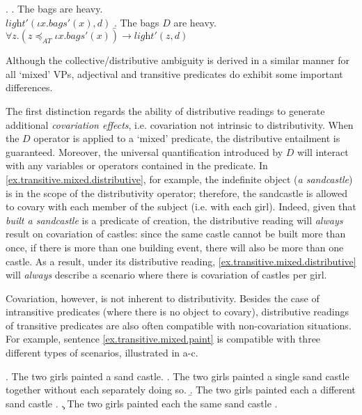 \documentclass[a4paper, 11pt]{article}
\begin{document}
    \ex. \label{ex.adjectival.mixed.LF}
\a. The bags are heavy.\\
 $ \textit{light}'(\iota x.\mathit{bags}'(x),d)$
\b. The bags $D$ are heavy.\\
    $\forall z. (z \preceq_{AT}\iota x.\mathit{bags}'(x)) \rightarrow  \textit{light}'(z,d)$

Although the collective/distributive ambiguity is derived in a similar manner for all `mixed' VPs, adjectival and transitive predicates do exhibit some important differences. \vspace{0.5cm}

The first distinction regards the ability of distributive readings to generate additional \emph{covariation effects}, i.e. covariation not intrinsic to distributivity. When the $D$ operator is applied to a `mixed' predicate, the distributive entailment is guaranteed. Moreover, the universal quantification introduced by $D$ will interact with any variables or operators contained in the predicate.
In \ref{ex.transitive.mixed.distributive}, for example, the indefinite object (\textit{a sandcastle}) is in the scope of the distributivity operator; therefore, the sandcastle is allowed to covary with each member of the subject (i.e. with each girl). 
Indeed, given that \textit{built a sandcastle} is a predicate of creation, the distributive reading will \emph{always} result on covariation of castles: since the same castle cannot be built more than once, if there is more than one building event, there will also be more than one castle. As a result, under its distributive reading, \ref{ex.transitive.mixed.distributive} will \emph{always} describe a scenario where there is covariation of castles per girl. 

Covariation, however, is not inherent to distributivity. Besides the case of intransitive predicates (where there is no object to covary), distributive readings of transitive predicates are also often compatible with non-covariation situations. 
For example, sentence \ref{ex.transitive.mixed.paint} is compatible with three different types of scenarios, illustrated in a-c. 

\ex. The two girls painted a sand castle. \label{ex.transitive.mixed.paint}
\a. The two girls painted a single sand castle together without each separately doing so. \label{ex.transitive.mixed.paintA}
\b.  The two girls painted each a different sand castle .\label{ex.transitive.mixed.paintB}
\c. The two girls painted each the same sand castle .\label{ex.transitive.mixed.paintC}
\end{document}
